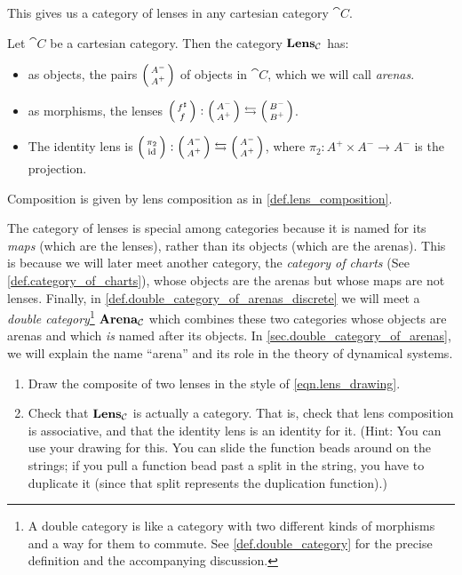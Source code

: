 \documentclass[DynamicalBook]{subfiles}
\begin{document}
This gives us a category of lenses in any cartesian category $\cat{C}$.

\begin{definition}\label{def.lens_category}
Let $\cat{C}$ be a cartesian category. Then the category $\textbf{Lens}_{\mathcal{C}}$
has:
\begin{itemize}
\item as objects, the pairs $\lens{A^-}{A^+}$ of objects in $\cat{C}$, which we will
  call \emph{arenas}.
\item as morphisms, the lenses $\lens{f^{\sharp}}{f} : \lens{A^-}{A^+} \leftrightarrows \lens{B^-}{B^+}$.
\item The identity lens is $\lens{\pi_2}{\id} : \lens{A^-}{A^+} \leftrightarrows
  \lens{A^-}{A^+}$, where $\pi_2 : A^+ \times A^- \to A^-$ is the projection.
\end{itemize}
\item Composition is given by lens composition as in \cref{def.lens_composition}.
\end{definition}

\begin{remark}
  The category of lenses is special among categories because it is named for its
  \emph{maps} (which are the lenses), rather than its objects (which are the
  arenas). This is because we will later meet another category, the
  \emph{category of charts} (See \cref{def.category_of_charts}), whose objects are
  the arenas but whose maps are not lenses. Finally, in
  \cref{def.double_category_of_arenas_discrete} we will meet a \emph{double
    category}\footnote{A double category is like a category with two different
    kinds of morphisms and a way for them to commute. See
    \cref{def.double_category} for the precise definition and the accompanying
    discussion.} $\textbf{Arena}_{\mathcal{C}}$ which combines these two categories whose objects
  are arenas and which \emph{is} named after its objects. In
  \cref{sec.double_category_of_arenas}, we will explain the name ``arena'' and
  its role in the theory of dynamical systems.
\end{remark}

\begin{exercise}
  \begin{enumerate}
  	\item Draw the composite of two lenses in the style of \eqref{eqn.lens_drawing}.
   	\item Check that $\textbf{Lens}_{\mathcal{C}}$ is actually a category. That is, check that
    lens composition is associative, and that the identity lens is an identity
    for it. (Hint: You can use your drawing for this. You can slide the function
    beads around on the strings; if you pull a function bead past a split in the
    string, you have to duplicate it (since that split represents the
    duplication function).)
  \qedhere
  \end{enumerate}
\end{exercise}
\end{document}
